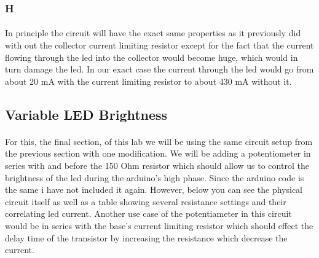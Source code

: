 \documentclass[12pt]{article}
\begin{document}
			\subsubsection{H}
				\paragraph{}
					In principle the circuit will have the exact same properties as it previously did with out the collector current limiting resistor except for the fact
					that the current flowing through the led into the collector would become huge, which would in turn damage the led.  In our exact case the current
					through the led would go from about 20 mA with the current limiting resistor to about 430 mA without it.

		\subsection{Variable LED Brightness}
			\paragraph{}
				For this, the final section, of this lab we will be using the same circuit setup from the previous section with one modification.  We will be adding a 
				potentiometer in series with and before the 150 Ohm resistor which should allow us to control the brightness of the led during the arduino's high
				phase.  Since the arduino code is the same i have not included it again.  However, below you can see the physical circuit itself as well as a table
				showing several resistance settings and their correlating led current.  Another use case of the potentiameter in this circuit would be in series with 
				the base's current limiting resistor which should effect the delay time of the transistor by increasing the resistance which decrease the current.
\end{document}
